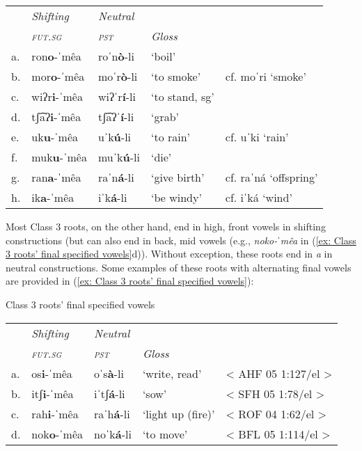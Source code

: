 \begin{tabular}{lllll}
     & \textit{Shifting} & \textit{Neutral}\\
     & \textit{\textsc{fut.sg}} & \textit{\textit{\textsc{pst}}} & \textit{Gloss} \\
     a. & {ron\textbf{o}-ˈmêa} & {roˈn\textbf{ò}-li} & {‘boil’}\\
     b. & {mor\textbf{o}-ˈmêa} & {moˈr\textbf{ò}-li} & {‘to smoke’} & {cf. moˈri ‘smoke’}\\
     c. & {wiʔr\textbf{i}-ˈmêa} & {wiʔˈr\textbf{í}-li} & {‘to stand, sg’} & {}\\
     d. & {tʃ͡aʔ\textbf{i}-ˈmêa} & {tʃ͡aʔˈ\textbf{í}-li} & {`grab'} & {}\\
     e. & {uk\textbf{u}-ˈmêa} & {uˈk\textbf{ú}-li} & {`to rain'} & {cf. uˈki `rain'}\\
     f. & {muk\textbf{u}-ˈmêa} & {muˈk\textbf{ú}{}-li} & {`die'} & {}\\
     g. & {ran\textbf{a}{}-ˈmêa} & {raˈn\textbf{á}{}-li} & {`give birth'} & {cf. raˈná `offspring'}\\
     h. & {ik\textbf{a}{}-ˈmêa} & {iˈk\textbf{á}{}-li} & {`be windy'} & {cf. iˈká `wind'}\\
\end{tabular}
    \z

Most Class 3 roots, on the other hand, end in high, front vowels in shifting constructions (but can also end in back, mid vowels (e.g., \textit{noko-ˈmêa} in (\ref{ex: Class 3 roots’ final specified vowels}d)). Without exception, these roots end in \textit{a} in neutral constructions. Some examples of these roots with alternating final vowels are provided in (\ref{ex: Class 3 roots’ final specified vowels}):

\ea\label{ex: Class 3 roots’ final specified vowels}
{Class 3 roots’ final specified vowels}

\begin{tabular}{lllll}
 & \textit{Shifting} & \textit{Neutral}\\
     & \textit{\textsc{fut.sg}} & \textit{\textit{\textsc{pst}}} & \textit{Gloss} \\
     a. & {os\textbf{i}{}-ˈmêa} & {oˈs\textbf{à}{}-li} & {`write, read'} & {< AHF 05 1:127/el >}\\
     b. & {itʃ\textbf{i}{}-ˈmêa} & {iˈtʃ\textbf{á}{}-li} & {`sow'} & {< SFH 05 1:78/el >}\\
     c. & {rah\textbf{i}-ˈmêa} & {raˈh\textbf{á}{}-li} & {`light up (fire)'} & {< ROF 04 1:62/el >}\\
     d. & {nok\textbf{o}-ˈmêa} & {noˈk\textbf{á}{}-li} & {`to move'} & {< BFL 05 1:114/el >}\\
\end{tabular}


